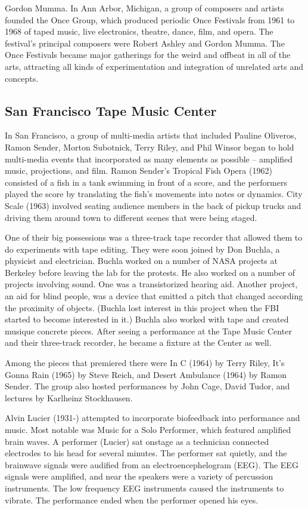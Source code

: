 Gordon Mumma. In Ann Arbor, Michigan, a group of composers and artists founded the Once Group, which produced periodic Once Festivals from 1961 to 1968 of taped music, live electronics, theatre, dance, film, and opera. The festival's principal composers were Robert Ashley and Gordon Mumma. The Once Festivals became major gatherings for the weird and offbeat in all of the arts, attracting all kinds of experimentation and integration of unrelated arts and concepts.


\subsection{San Francisco Tape Music Center}
In San Francisco, a group of multi-media artists that included Pauline Oliveros, Ramon Sender, Morton Subotnick, Terry Riley, and Phil Winsor began to hold multi-media events that incorporated as many elements as possible -- amplified music, projections, and film. Ramon Sender's Tropical Fish Opera (1962) consisted of a fish in a tank swimming in front of a score, and the performers played the score by translating the fish's movements into notes or dynamics. City Scale (1963) involved seating audience members in the back of pickup trucks and driving them around town to different scenes that were being staged.

One of their big possessions was a three-track tape recorder that allowed them to do experiments with tape editing. They were soon joined by Don Buchla, a physicist and electrician. Buchla worked on a number of NASA projects at Berkeley before leaving the lab for the protests. He also worked on a number of projects involving sound. One was a transistorized hearing aid. Another project, an aid for blind people, was a device that emitted a pitch that changed according the proximity of objects. (Buchla lost interest in this project when the FBI started to become interested in it.) Buchla also worked with tape and created musique concrete pieces. After seeing a performance at the Tape Music Center and their three-track recorder, he became a fixture at the Center as well.

Among the pieces that premiered there were In C (1964) by Terry Riley, It's Gonna Rain (1965) by Steve Reich, and Desert Ambulance (1964) by Ramon Sender. The group also hosted performances by John Cage, David Tudor, and lectures by Karlheinz Stockhausen.

Alvin Lucier (1931-) attempted to incorporate biofeedback into performance and music. Most notable was Music for a Solo Performer, which featured amplified brain waves. A performer (Lucier) sat onstage as a technician connected electrodes to his head for several minutes. The performer sat quietly, and the brainwave signals were audified from an electroencephelogram (EEG). The EEG signals were amplified, and near the speakers were a variety of percussion instruments. The low frequency EEG instruments caused the instruments to vibrate. The performance ended when the performer opened his eyes.

